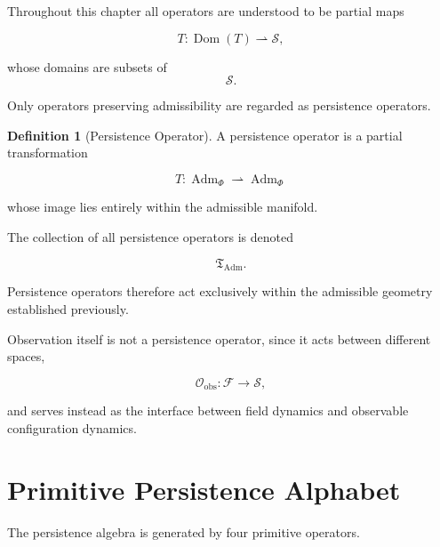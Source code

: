 \documentclass[11pt]{book}
\numberwithin{equation}{chapter}
\theoremstyle{definition}
\newtheorem{definition}{Definition}[chapter]
\theoremstyle{plain}
\begin{document}
Throughout this chapter all operators are understood to be partial maps

\[
T:
\operatorname{Dom}(T)
\rightharpoonup
\mathcal S,
\]

whose domains are subsets of
\[
\mathcal S.
\]

Only operators preserving admissibility are regarded as persistence operators.

\begin{definition}[Persistence Operator]
A persistence operator is a partial transformation

\[
T:
\operatorname{Adm}_{\Phi}
\rightharpoonup
\operatorname{Adm}_{\Phi}
\]

whose image lies entirely within the admissible manifold.

The collection of all persistence operators is denoted

\[
\mathfrak T_{\operatorname{Adm}}.
\]
\end{definition}

Persistence operators therefore act exclusively within the admissible geometry established previously.

Observation itself is not a persistence operator, since it acts between different spaces,

\[
\mathcal O_{\mathrm{obs}}
:
\mathcal F
\rightarrow
\mathcal S,
\]

and serves instead as the interface between field dynamics and observable configuration dynamics.

\section{Primitive Persistence Alphabet}

The persistence algebra is generated by four primitive operators.
\end{document}
